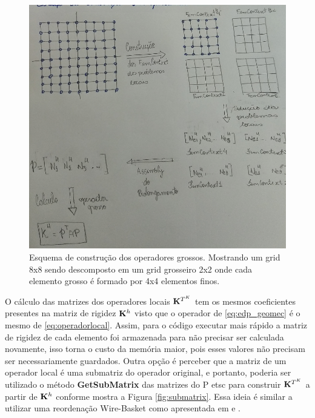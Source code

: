 \begin{figure}[!htbp]
\centering
\includegraphics[width=\textwidth]{chap07/figs/esquemaprolongamento.png}
\caption{Esquema de construção dos operadores grossos. Mostrando um grid 8x8 sendo descomposto em um grid grosseiro 2x2 onde cada elemento grosso é formado por 4x4 elementos finos.}
\label{fig:esquemaconstrucao}
\end{figure}


O cálculo das matrizes dos operadores locais $\mathbf{K}^{T^K}$ tem os mesmos coeficientes presentes na matriz de rigidez $\mathbf{K}^h$ visto que o operador de \eqref{eq:edp_geomec} é o mesmo de \eqref{eq:operadorlocal}. Assim, para o código executar mais rápido a matriz de rigidez de cada elemento foi armazenada para não precisar ser calculada novamente, isso torna o custo da memória maior, pois esses valores não precisam ser necessariamente guardados. Outra opção é perceber que a matriz de um operador local é uma submatriz do operador original, e portanto, poderia ser utilizado o método \textbf{GetSubMatrix} das matrizes do P etsc para construir $\mathbf{K}^{T^K}$ a partir de $\mathbf{K}^h$ conforme mostra a Figura \ref{fig:submatrix}. Essa ideia é similar a utilizar uma reordenação Wire-Basket como apresentada em \cite{casteletto} e \cite{irina}.

